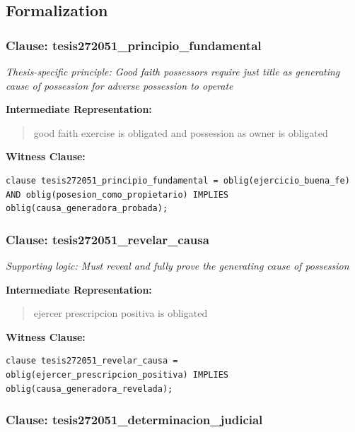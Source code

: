 \documentclass[11pt,a4paper]{article}
\begin{document}
\subsection{Formalization}

\subsubsection{Clause: tesis272051\_principio\_fundamental}

\textit{Thesis-specific principle: Good faith possessors require just title as generating cause of possession for adverse possession to operate}

\textbf{Intermediate Representation:}

\begin{quote}
good faith exercise is obligated and possession as owner is obligated
\end{quote}

\textbf{Witness Clause:}

\begin{lstlisting}[style=witnessstyle, language=Witness]
clause tesis272051_principio_fundamental = oblig(ejercicio_buena_fe) AND oblig(posesion_como_propietario) IMPLIES oblig(causa_generadora_probada);
\end{lstlisting}

\subsubsection{Clause: tesis272051\_revelar\_causa}

\textit{Supporting logic: Must reveal and fully prove the generating cause of possession}

\textbf{Intermediate Representation:}

\begin{quote}
ejercer prescripcion positiva is obligated
\end{quote}

\textbf{Witness Clause:}

\begin{lstlisting}[style=witnessstyle, language=Witness]
clause tesis272051_revelar_causa = oblig(ejercer_prescripcion_positiva) IMPLIES oblig(causa_generadora_revelada);
\end{lstlisting}

\subsubsection{Clause: tesis272051\_determinacion\_judicial}
\end{document}
